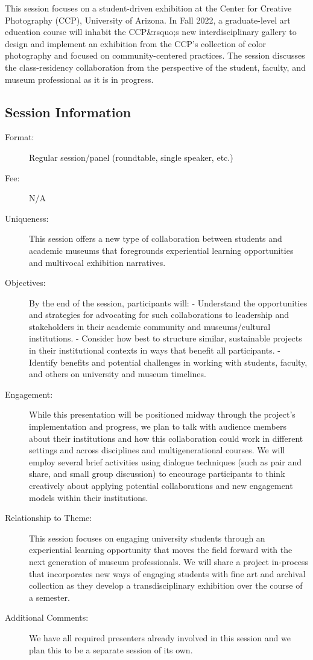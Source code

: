 \documentclass{report}
\begin{document}
              This session focuses on a student-driven exhibition at the Center for Creative Photography (CCP), University of Arizona. In Fall 2022, a graduate-level art education course will inhabit the CCP\&rsquo;s new interdisciplinary gallery to design and implement an exhibition from the CCP’s collection of color photography and focused on community-centered practices. The session discusses the class-residency collaboration from the perspective of the student, faculty, and museum professional as it is in progress.

              \subsection*{Session Information}
                \begin{description}
                  \item [Format:] Regular session/panel (roundtable, single speaker, etc.)
							    
								  \item [Fee:]N/A
							     
							    \item [Uniqueness:]This session offers a new type of collaboration between students and academic museums that foregrounds experiential learning opportunities and multivocal exhibition narratives.
							    \item [Objectives:]By the end of the session, participants will:
- Understand the opportunities and strategies for advocating for such collaborations to leadership and stakeholders in their academic community and museums/cultural institutions.
- Consider how best to structure similar, sustainable projects in their institutional contexts in ways that benefit all participants.
- Identify benefits and potential challenges in working with students, faculty, and others on university and museum timelines.
							    \item [Engagement:]While this presentation will be positioned midway through the project’s implementation and progress, we plan to talk with audience members about their institutions and how this collaboration could work in different settings and across disciplines and multigenerational courses. We will employ several brief activities using dialogue techniques (such as pair and share, and small group discussion) to encourage participants to think creatively about applying potential collaborations and new engagement models within their institutions.
							    \item [Relationship to Theme:]This session focuses on engaging university students through an experiential learning opportunity that moves the field forward with the next generation of museum professionals. We will share a project in-process that incorporates new ways of engaging students with fine art and archival collection as they develop a transdisciplinary exhibition over the course of a semester.
							    
                    \item [Additional Comments: ]We have all required presenters already involved in this session and we plan this to be a separate session of its own.  

                \end{description}
\end{document}
